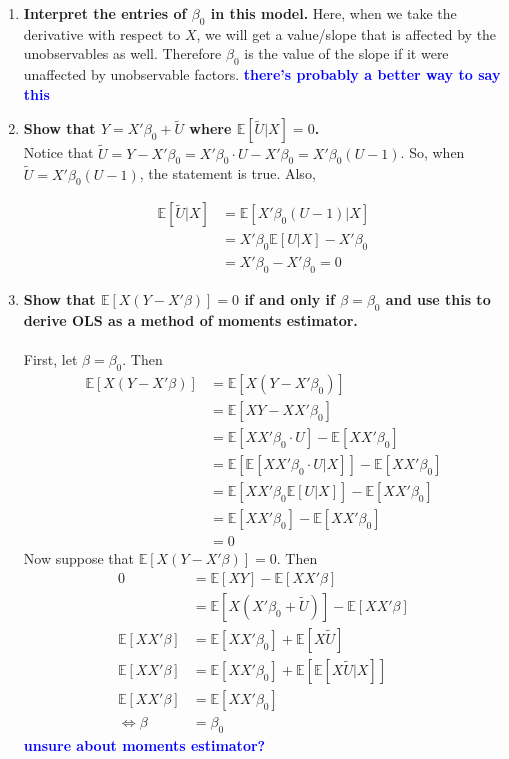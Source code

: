 \documentclass[]{article}
\newcommand{\E}{\mathbb{E}}
\newcommand{\fix} [1] {\textbf{\textcolor{blue}{#1}}} %
\begin{document}
\begin{enumerate}[label = (\roman*)]

\item \textbf{Interpret the entries of $\beta_0$ in this model.} Here, when we take the derivative with respect to $X$, we will get a value/slope that is affected by the unobservables as well. Therefore $\beta_0$ is the value of the slope if it were unaffected by unobservable factors. \fix{there's probably a better way to say this}


\item \textbf{Show that $Y= X'\beta_0+\tilde{U}$ where $\mathbb{E} [\tilde{U}|X] = 0$.} \\
Notice that $\tilde{U} = Y - X'\beta_0 = X'\beta_0\cdot U - X'\beta_0 = X'\beta_0(U-1)$. So, when $\tilde{U} = X'\beta_0(U-1)$, the statement is true. Also, 

\begin{align*}
\E[\tilde{U} |X] 
& = \E[X'\beta_0(U-1) |X] \\
& = X'\beta_0\E[U|X] - X'\beta_0 \\
& = X'\beta_0 - X'\beta_0 = 0 
\end{align*}


\item \textbf{Show that   $\E[X(Y - X'\beta)] = 0$ if and only if $\beta = \beta_0$ and use this to derive OLS as a method of moments estimator.} \\
\\
First, let $\beta = \beta_0$. Then 
\begin{align*}
\E[X(Y - X'\beta)] & = \E[X(Y - X'\beta_0)] \\
& = \E[XY - XX'\beta_0] \\
& = \E[XX'\beta_0\cdot U] - \E[XX'\beta_0]  \\
& = \E[\E[XX'\beta_0\cdot U|X]] - \E[XX'\beta_0] \\
& = \E[XX'\beta_0\E[U|X]] - \E[XX'\beta_0]\\
& = \E[XX'\beta_0] - \E[XX'\beta_0] \\
& = 0 
\end{align*}
Now suppose that $\E[X(Y - X'\beta)] = 0$. Then
\begin{align*}
0 & = \E[XY] - \E[XX'\beta] \\
& =  \E[X(X'\beta_0 +\tilde{ U})] - \E[XX'\beta] \\
\E[XX'\beta] & = \E[XX'\beta_0] + \E[X\tilde{U}] \\
\E[XX'\beta] & = \E[XX'\beta_0] + \E[\E[X\tilde{U}|X]] \\
\E[XX'\beta] & = \E[XX'\beta_0] \\
\iff \beta & = \beta_0
\end{align*}
\fix{ unsure about moments estimator? } 



\end{enumerate}
\end{document}
